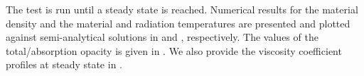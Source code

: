 \documentclass[times,doublespace]{fldauth}%
\begin{document}
The test is run until a steady state is reached. Numerical results for the material density and the material and radiation temperatures are presented and plotted against semi-analytical solutions in  and , respectively. The values of the total/absorption opacity is given in . We also provide the viscosity coefficient profiles at steady state in .
%
\end{document}
